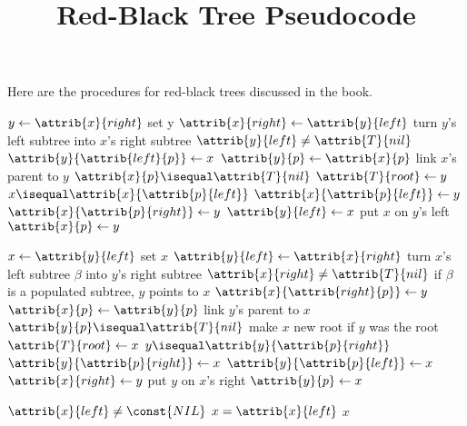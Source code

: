 \documentclass[12pt]{article}
\title{Red-Black Tree Pseudocode}
\author{}
\date{}
\begin{document}
\maketitle

Here are the procedures for red-black trees discussed in the book.

\begin{codebox}
\li $y \gets{\attrib{x}{right}}$ \Comment set y
\li $\attrib{x}{right} \gets{\attrib{y}{left}}$ \Comment turn $y$'s left subtree into $x$'s right subtree
\li \If $\attrib{y}{left} \neq \attrib{T}{nil}$
\li \Then
        $\attrib{y}{\attrib{left}{p}} \gets{x}$
    \End
\li $\attrib{y}{p} \gets{\attrib{x}{p}}$ \Comment link $x$'s parent to $y$
\li \If $\attrib{x}{p} \isequal \attrib{T}{nil}$
\li \Then
        $\attrib{T}{root} \gets{y}$
\li \ElseIf $x \isequal \attrib{x}{\attrib{p}{left}}$
\li \Then
        $\attrib{x}{\attrib{p}{left}} \gets{y}$
\li \Else
\li     $\attrib{x}{\attrib{p}{right}} \gets{y}$
    \End
\li $\attrib{y}{left} \gets{x}$ \Comment put $x$ on $y$'s left
\li $\attrib{x}{p} \gets{y}$
\end{codebox}

\begin{codebox}
\li $x \gets{\attrib{y}{left}}$ \Comment set $x$
\li $\attrib{y}{left} \gets{\attrib{x}{right}}$ \Comment turn $x$'s left subtree $\beta$ into $y$'s right subtree
\li \If $\attrib{x}{right} \neq \attrib{T}{nil}$ \Comment if $\beta$ is a populated subtree, $y$ points to $x$
\li \Then
        $\attrib{x}{\attrib{right}{p}} \gets{y}$
    \End
\li $\attrib{x}{p} \gets{\attrib{y}{p}}$ \Comment link $y$'s parent to $x$
\li \If $\attrib{y}{p} \isequal \attrib{T}{nil}$ \Comment make $x$ new root if $y$ was the root
\li \Then
        $\attrib{T}{root} \gets{x}$
\li \ElseIf $y \isequal \attrib{y}{\attrib{p}{right}}$
\li \Then
        $\attrib{y}{\attrib{p}{right}} \gets{x}$
\li \Else
\li     $\attrib{y}{\attrib{p}{left}} \gets{x}$
    \End
\li $\attrib{x}{right} \gets{y}$ \Comment put $y$ on $x$'s right
\li $\attrib{y}{p} \gets{x}$
\end{codebox}

\begin{codebox}
\li \While $\attrib{x}{left} \neq \const{NIL}$
    \Do
    \li     $x = \attrib{x}{left}$
    \End
\li \Return $x$
\end{codebox}
\end{document}
